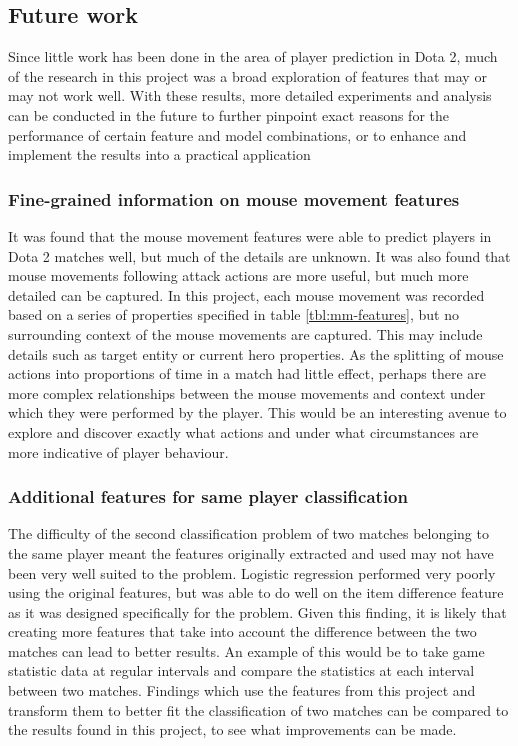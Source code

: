 \documentclass[Report.tex]{subfiles}
\begin{document}



\subsection{Future work}
Since little work has been done in the area of player prediction in Dota 2, much of the research in this project was a broad exploration of features that may or may not work well. With these results, more detailed experiments and analysis can be conducted in the future to further pinpoint exact reasons for the performance of certain feature and model combinations, or to enhance and implement the results into a practical application

\subsubsection{Fine-grained information on mouse movement features}
It was found that the mouse movement features were able to predict players in Dota 2 matches well, but much of the details are unknown. It was also found that mouse movements following attack actions are more useful, but much more detailed can be captured. In this project, each mouse movement was recorded based on a series of properties specified in table \ref{tbl:mm-features}, but no surrounding context of the mouse movements are captured. This may include details such as target entity or current hero properties. As the splitting of mouse actions into proportions of time in a match had little effect, perhaps there are more complex relationships between the mouse movements and context under which they were performed by the player. This would be an interesting avenue to explore and discover exactly what actions and under what circumstances are more indicative of player behaviour.

\subsubsection{Additional features for same player classification}
The difficulty of the second classification problem of two matches belonging to the same player meant the features originally extracted and used may not have been very well suited to the problem. Logistic regression performed very poorly using the original features, but was able to do well on the item difference feature as it was designed specifically for the problem. Given this finding, it is likely that creating more features that take into account the difference between the two matches can lead to better results. An example of this would be to take game statistic data at regular intervals and compare the statistics at each interval between two matches. Findings which use the features from this project and transform them to better fit the classification of two matches can be compared to the results found in this project, to see what improvements can be made. 
\end{document}
